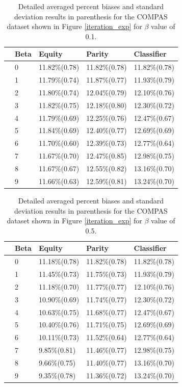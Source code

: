 \begin{table}[h]
\begin{tabular}{ c p{0.5cm} p{1.7cm} p{1.7cm} p{1.7cm}}
 \toprule
& \textbf{Beta} & \textbf{Equity} &\textbf{Parity}&\textbf{Classifier}\\
 \midrule
 \parbox[t]{2mm}{} & 
 0&11.82\%(0.78)&11.82\%(0.78) &11.82\%(0.78)\\[1pt]
   &1&11.79\%(0.74)& 11.87\%(0.77)&11.93\%(0.79)\\[1pt]
   &2&11.80\%(0.74)& 12.04\%(0.79)&12.10\%(0.76)\\[1pt]
   &3&11.82\%(0.75)& 12.18\%(0.80)&12.30\%(0.72)\\[1pt]
   &4&11.79\%(0.69)&12.25\%(0.76) &12.47\%(0.67)\\[1pt]
 & 5&11.84\%(0.69)&12.40\%(0.77) &12.69\%(0.69)\\[1pt]
 &6&11.70\%(0.60)&12.39\%(0.73) &12.77\%(0.64)\\[1pt]
 &7&11.67\%(0.70)&12.47\%(0.85) &12.98\%(0.75)\\[1pt]
 &8&11.67\%(0.67)&12.55\%(0.82) &13.16\%(0.70)\\[1pt]
  &9&11.66\%(0.63)&12.59\%(0.81) &13.24\%(0.70)\\[1pt]
 \bottomrule
\end{tabular}
\caption{Detailed averaged percent biases and standard deviation results in parenthesis for the COMPAS dataset shown in Figure \ref{iteration_exp} for $\beta$ value of 0.1.}
\label{compas_feed_0.1}
\end{table}



\begin{table}[h]
\begin{tabular}{ c p{0.5cm} p{1.7cm} p{1.7cm} p{1.7cm}}
 \toprule
& \textbf{Beta} & \textbf{Equity} &\textbf{Parity}&\textbf{Classifier}\\
 \midrule
 \parbox[t]{2mm}{} & 
 0&11.18\%(0.78)& 11.82\%(0.78)&11.82\%(0.78)\\[1pt]
   &1&11.45\%(0.73)& 11.75\%(0.73)&11.93\%(0.79)\\[1pt]
   &2&11.18\%(0.70)& 11.77\%(0.77)&12.10\%(0.76)\\[1pt]
   &3&10.90\%(0.69)& 11.74\%(0.77)&12.30\%(0.72)\\[1pt]
   &4&10.63\%(0.75)& 11.68\%(0.77)&12.47\%(0.67)\\[1pt]
 & 5&10.40\%(0.76)& 11.71\%(0.75)&12.69\%(0.69)\\[1pt]
 &6&10.11\%(0.73)&11.52\%(0.64) &12.77\%(0.64)\\[1pt]
 &7&9.85\%(0.81)&11.46\%(0.77) &12.98\%(0.75)\\[1pt]
 &8&9.66\%(0.75)&11.40\%(0.77) &13.16\%(0.70)\\[1pt]
  &9&9.35\%(0.78)&11.36\%(0.72) &13.24\%(0.70)\\[1pt]
 \bottomrule
\end{tabular}
\caption{Detailed averaged percent biases and standard deviation results in parenthesis for the COMPAS dataset shown in Figure \ref{iteration_exp} for $\beta$ value of 0.5.}
\label{compas_feed_0.5}
\end{table}


